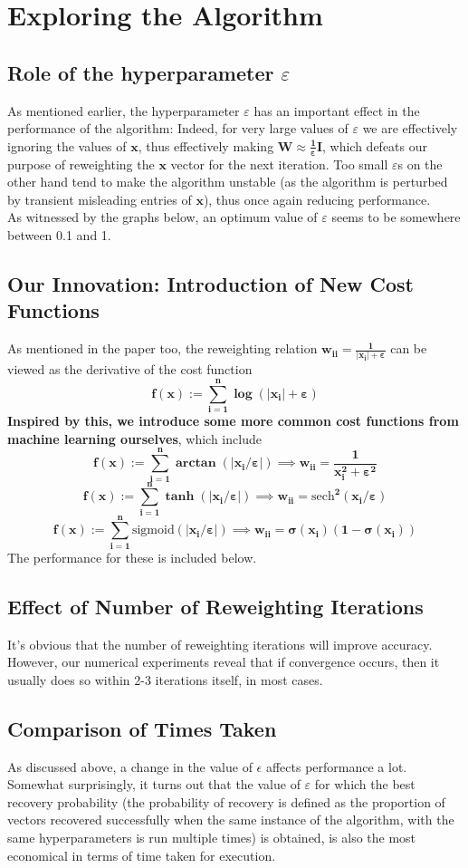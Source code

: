 \documentclass[a4paper,14pt]{article}
\numberwithin{definition}{section}
\numberwithin{mytheorem}{subsection}
\begin{document}
\section{Exploring the Algorithm}
\subsection{Role of the hyperparameter $\varepsilon$}
As mentioned earlier, the hyperparameter $\varepsilon$ has an important effect in the performance of the algorithm: Indeed, for very large values of $\varepsilon$ we are effectively ignoring the values of $\boldsymbol{x}$, thus effectively making $\boldsymbol{W \approx \frac{1}{\varepsilon}I}$, which defeats our purpose of reweighting the $\boldsymbol{x}$ vector for the next iteration. Too small $\varepsilon$s on the other hand tend to make the algorithm unstable (as the algorithm is perturbed by transient misleading entries of $\boldsymbol{x}$), thus once again reducing performance.\\
As witnessed by the graphs below, an optimum value of $\varepsilon$ seems to be somewhere between 0.1 and 1.
\subsection{Our Innovation: Introduction of New Cost Functions}
As mentioned in the paper too, the reweighting relation $\boldsymbol{w_{ii} = \frac{1}{|x_i|+\varepsilon}}$ can be viewed as the derivative of the cost function 
$$\boldsymbol{f(x) := \sum^{n}_{i = 1}\log (|x_i|+\varepsilon)}$$
\textbf{Inspired by this, we introduce some more common cost functions from machine learning ourselves}, which include
$$\boldsymbol{f(x) := \sum^{n}_{i = 1}\arctan (|x_i/\varepsilon|)\implies w_{ii} = \frac{1}{x_i^2+\varepsilon^2}}$$
$$\boldsymbol{f(x) := \sum^{n}_{i = 1}\tanh (|x_i/\varepsilon|)\implies w_{ii} = \mathrm{sech}^2(x_i/\varepsilon)}$$
$$\boldsymbol{f(x) := \sum^{n}_{i = 1}\mathrm{sigmoid} (|x_i/\varepsilon|)\implies w_{ii} = \sigma(x_i)(1-\sigma(x_i))}$$
The performance for these is included below.
\subsection{Effect of Number of Reweighting Iterations}
It's obvious that the number of reweighting iterations will improve accuracy. However, our numerical experiments reveal that if convergence occurs, then it usually does so within 2-3 iterations itself, in most cases.
\subsection{Comparison of Times Taken}
As discussed above, a change in the value of $\epsilon$ affects performance a lot. Somewhat surprisingly, it turns out that the value of $\varepsilon$ for which the best recovery probability (the probability of recovery is defined as the proportion of vectors recovered successfully when the same instance of the algorithm, with the same hyperparameters is run multiple times) is obtained, is also the most economical in terms of time taken for execution.
\end{document}

